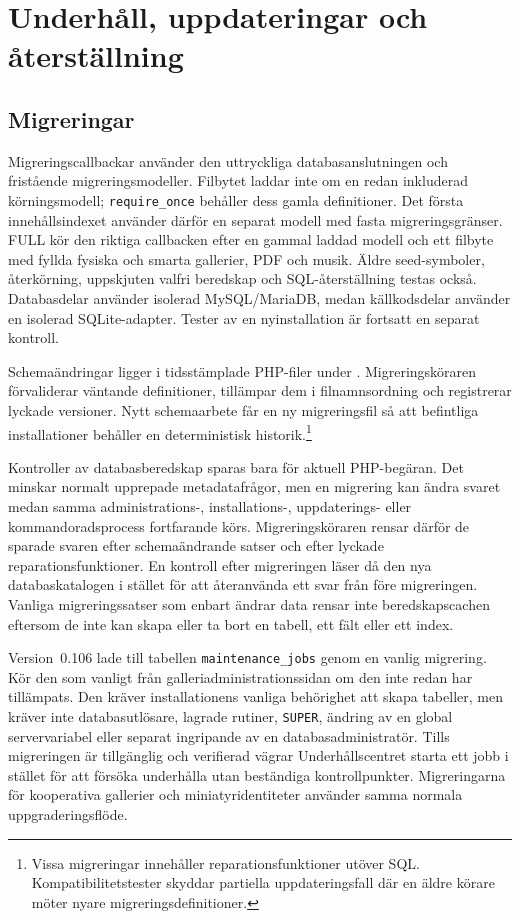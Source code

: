 \documentclass[11pt,a4paper]{article}
\newcommand{\filepath}[1]{\path{#1}}
\newcommand{\codeword}[1]{\nolinkurl{#1}}
\begin{document}
\section{Underhåll, uppdateringar och återställning}
\label{sec:maintenance}

\subsection{Migreringar}

Migreringscallbackar använder den uttryckliga databasanslutningen och fristående
migreringsmodeller. Filbytet laddar inte om en redan inkluderad körningsmodell;
\codeword{require\_once} behåller dess gamla definitioner. Det första
innehållsindexet
använder därför en separat modell med fasta migreringsgränser. FULL kör den
riktiga
callbacken efter en gammal laddad modell och ett filbyte med fyllda fysiska och
smarta gallerier, PDF och musik. Äldre seed-symboler, återkörning, uppskjuten
valfri beredskap och SQL-återställning testas också. Databasdelar använder
isolerad
MySQL/MariaDB, medan källkodsdelar använder en isolerad SQLite-adapter.
Tester av en nyinstallation är fortsatt en separat kontroll.

Schemaändringar ligger i tidsstämplade PHP-filer under
\filepath{database/migrations/}. Migreringsköraren förvaliderar väntande
definitioner, tillämpar dem i filnamnsordning och registrerar lyckade versioner.
Nytt schemaarbete får en ny migreringsfil så att befintliga installationer
behåller en deterministisk historik.\footnote{Vissa migreringar innehåller
reparationsfunktioner utöver SQL. Kompatibilitetstester skyddar partiella
uppdateringsfall där en äldre körare möter nyare migreringsdefinitioner.}

Kontroller av databasberedskap sparas bara för aktuell PHP-begäran. Det minskar
normalt upprepade metadatafrågor, men en migrering kan ändra svaret medan samma
administrations-, installations-, uppdaterings- eller kommandoradsprocess
fortfarande körs. Migreringsköraren rensar därför de sparade svaren efter
schemaändrande satser och efter lyckade reparationsfunktioner. En kontroll efter
migreringen läser då den nya databaskatalogen i stället för att återanvända ett
svar från före migreringen. Vanliga migreringssatser som enbart ändrar data
rensar inte beredskapscachen eftersom de inte kan skapa eller ta bort en tabell,
ett fält eller ett index.

Version~0.106 lade till tabellen \codeword{maintenance\_jobs} genom en vanlig
migrering. Kör den som vanligt från galleriadministrationssidan om den inte
redan har tillämpats. Den kräver installationens vanliga behörighet att skapa
tabeller, men kräver inte databasutlösare, lagrade rutiner, \codeword{SUPER},
ändring av en global servervariabel eller separat ingripande av en
databasadministratör. Tills migreringen är tillgänglig och verifierad vägrar
Underhållscentret starta ett jobb i stället för att försöka underhålla utan
beständiga kontrollpunkter. Migreringarna för kooperativa gallerier och
miniatyridentiteter använder samma normala uppgraderingsflöde.
\end{document}
